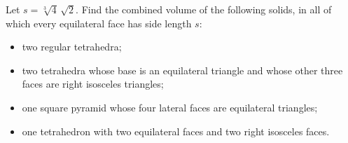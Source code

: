 Let $s=\sqrt[3]{4}\,\sqrt2$. Find the combined volume of the following solids, in all of which every equilateral face has side length $s$:
\begin{itemize}
\item two regular tetrahedra;
\item two tetrahedra whose base is an equilateral triangle and whose other three faces are right isosceles triangles;
\item one square pyramid whose four lateral faces are equilateral triangles;
\item one tetrahedron with two equilateral faces and two right isosceles faces.
\end{itemize}
